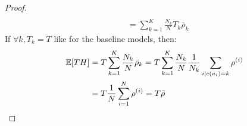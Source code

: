 \begin{proof}
\begin{align*}
        \\
        &= \sum_{k=1}^{K}{\frac{N_k}{N} T_k \bar{\rho}_k}%
    \end{align*}
    If $\forall k, T_k = T$ like for the baseline models, then:
    \begin{align*}
        \mathbb{E}\off{T H} &= T \sum_{k=1}^{K}{\frac{N_k}{N} \bar{\rho}_k}%
        = T \sum_{k=1}^{K}{\frac{N_k}{N} \frac{1}{N_k}\sum_{i \mid c\of{a_i}=k}{\rho^{\of{i}}}}%
        \\
        &= T \frac{1}{N} \sum_{i=1}^{N}{\rho^{\of{i}}}%
        = T \bar{\rho}%
    \end{align*}
\end{proof}

